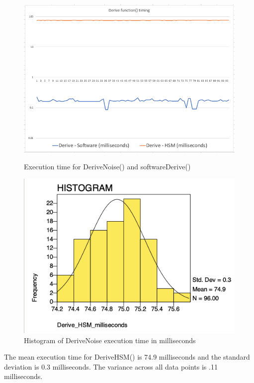 \documentclass [11pt, proquest] {uwthesis}[2020/02/24]
\begin{document}
\begin{figure}
\centering
\begin{minipage}{.5\textwidth}
  \centering
  \includegraphics[width=1\linewidth]{paper/images/deriveFunctiongraph.png}
  \caption{Execution time for DeriveNoise() and softwareDerive()}
  \label{fig:funcTimeGraph}
\end{minipage}%
\begin{minipage}{.5\textwidth}
  \centering
  \includegraphics[width=1\linewidth]{paper/images/DeriveNoise freq.png}
  \caption{Histogram of DeriveNoise execution time in milliseconds}
  \label{fig:hsmTimeGraph}
\end{minipage}
\end{figure}

The mean execution time for DeriveHSM() is 74.9 milliseconds and the standard deviation is 0.3 milliseconds. The variance across all data points is .11 milliseconds. 
\end{document}
